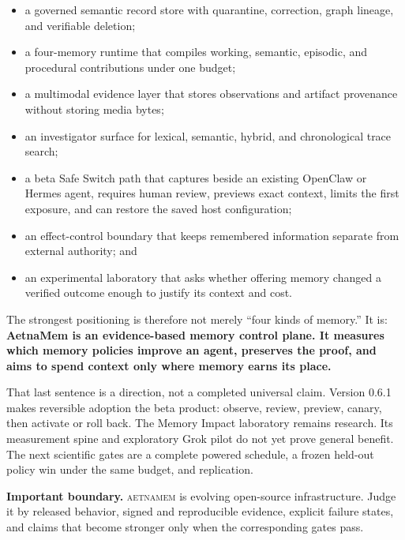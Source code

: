 \documentclass[11pt]{article}
\newcommand{\system}{\textsc{aetnamem}}
\newcommand{\boundary}[1]{%
  \par\smallskip\noindent\textbf{Important boundary.} #1}
\begin{document}
\begin{itemize}
  \item a governed semantic record store with quarantine, correction, graph
        lineage, and verifiable deletion;
  \item a four-memory runtime that compiles working, semantic, episodic, and
        procedural contributions under one budget;
  \item a multimodal evidence layer that stores observations and artifact
        provenance without storing media bytes;
  \item an investigator surface for lexical, semantic, hybrid, and
        chronological trace search;
  \item a beta Safe Switch path that captures beside an existing OpenClaw or
        Hermes agent, requires human review, previews exact context, limits the
        first exposure, and can restore the saved host configuration;
  \item an effect-control boundary that keeps remembered information separate
        from external authority; and
  \item an experimental laboratory that asks whether offering memory changed a
        verified outcome enough to justify its context and cost.
\end{itemize}

The strongest positioning is therefore not merely ``four kinds of memory.''
It is: \textbf{AetnaMem is an evidence-based memory control plane. It measures
which memory policies improve an agent, preserves the proof, and aims to spend
context only where memory earns its place.}

That last sentence is a direction, not a completed universal claim. Version
0.6.1 makes reversible adoption the beta product: observe, review, preview,
canary, then activate or roll back. The Memory Impact laboratory remains
research. Its measurement spine and exploratory Grok pilot do not yet prove
general benefit. The next scientific gates are a complete powered schedule, a
frozen held-out policy win under the same budget, and replication.

\boundary{\system{} is evolving open-source infrastructure. Judge it by
released behavior, signed and reproducible evidence, explicit failure states,
and claims that become stronger only when the corresponding gates pass.}
\end{document}
